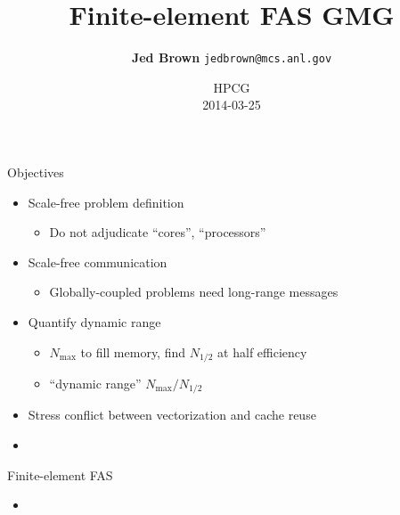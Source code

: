 \documentclass{beamer}
\title{Finite-element FAS GMG}
\author{{\bf Jed Brown} \texttt{jedbrown@mcs.anl.gov}}
\institute
{ \small
  Mathematics and Computer Science Division, Argonne National Laboratory \\
  {\small Department of Computer Science, University of Colorado Boulder}
}
\date{HPCG \\ 2014-03-25}
\begin{document}
\lstset{language=C}
\normalem

\begin{frame}{Objectives}
  \begin{itemize}
  \item Scale-free problem definition
    \begin{itemize}
    \item Do not adjudicate ``cores'', ``processors''
    \end{itemize}
  \item Scale-free communication
    \begin{itemize}
    \item Globally-coupled problems need long-range messages
    \end{itemize}
  \item Quantify dynamic range
    \begin{itemize}
    \item $N_{\text{max}}$ to fill memory, find $N_{1/2}$ at half efficiency
    \item ``dynamic range'' $N_{\text{max}}/N_{1/2}$
    \end{itemize}
  \item Stress conflict between vectorization and cache reuse
  \item 
  \end{itemize}
\end{frame}

\begin{frame}{Finite-element FAS}
  \begin{itemize}
  \item 
  \end{itemize}
\end{frame}
\end{document}
